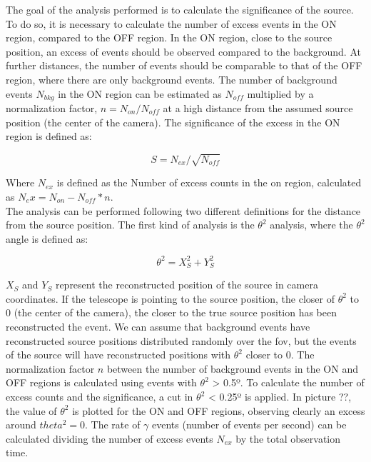 \documentclass[main.tex]{subfiles}
\begin{document}
The goal of the analysis performed is to calculate the significance of the source. To do so, it is necessary to calculate the number of excess events in the ON region, compared to the OFF region. In the ON region, close to the source position, an excess of events should be observed compared to the background. At further distances, the number of events should be comparable to that of the OFF region, where there are only background events. The number of background events $N_{bkg}$ in the ON region can be estimated as $N_{off}$ multiplied by a normalization factor, $n = N_{on}/N_{off}$ at a high distance from the assumed source position (the center of the camera). The significance of the excess in the ON region is defined as: 

\begin{equation}
  S = N_{ex}/\sqrt{N_{off}}
\end{equation}

Where $N_{ex}$ is defined as the Number of excess counts in the on region, calculated as $N_ex=N_{on}-N_{off} * n$. \\
The analysis can be performed following two different definitions for the distance from the source position. The first kind of analysis is the $\theta^2$ analysis, where the $\theta^2$ angle is defined as:

\begin{equation}
  \theta^2 = X_{S}^2 + Y_{S}^2 
\end{equation}

$X_{S}$ and $Y_{S}$ represent the reconstructed position of the source in camera coordinates. If the telescope is pointing to the source position, the closer of $\theta^2$ to 0 (the center of the camera), the closer to the true source position has been reconstructed the event. We can assume that background events have reconstructed source positions distributed randomly over the \gls{fov}, but the events of the source will have reconstructed positions with $\theta^2$ closer to 0. The normalization factor $n$ between the number of background events in the ON and OFF regions is calculated using events with $\theta^2$ > 0.5º. To calculate the number of excess counts and the significance, a cut in $\theta^2$ < 0.25º is applied. In picture ??, the value of $\theta^2$ is plotted for the ON and OFF regions, observing clearly an excess around $theta^2=0$. The rate of $\gamma$ events (number of events per second) can be calculated dividing the number of excess events $N_{ex}$ by the total observation time.\\
\end{document}
